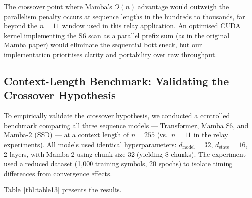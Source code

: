 The crossover point where Mamba's \(O(n)\) advantage would outweigh the parallelism penalty occurs at sequence lengths in the hundreds to thousands, far beyond the \(n = 11\) window used in this relay application. An optimised CUDA kernel implementing the S6 scan as a parallel prefix sum (as in the original Mamba paper) would eliminate the sequential bottleneck, but our implementation prioritises clarity and portability over raw throughput.

\subsection{Context-Length Benchmark: Validating the Crossover Hypothesis}\label{sec:context-length-benchmark-validating-the-crossover-hypothesis}

To empirically validate the crossover hypothesis, we conducted a controlled benchmark comparing all three sequence models --- Transformer, Mamba S6, and Mamba-2 (SSD) --- at a context length of \(n = 255\) (vs.~\(n = 11\) in the relay experiments). All models used identical hyperparameters: \(d_{\text{model}} = 32\), \(d_{\text{state}} = 16\), 2 layers, with Mamba-2 using chunk size 32 (yielding 8 chunks). The experiment used a reduced dataset (1,000 training symbols, 20 epochs) to isolate timing differences from convergence effects.

Table~\ref{tbl:table13} presents the results.

